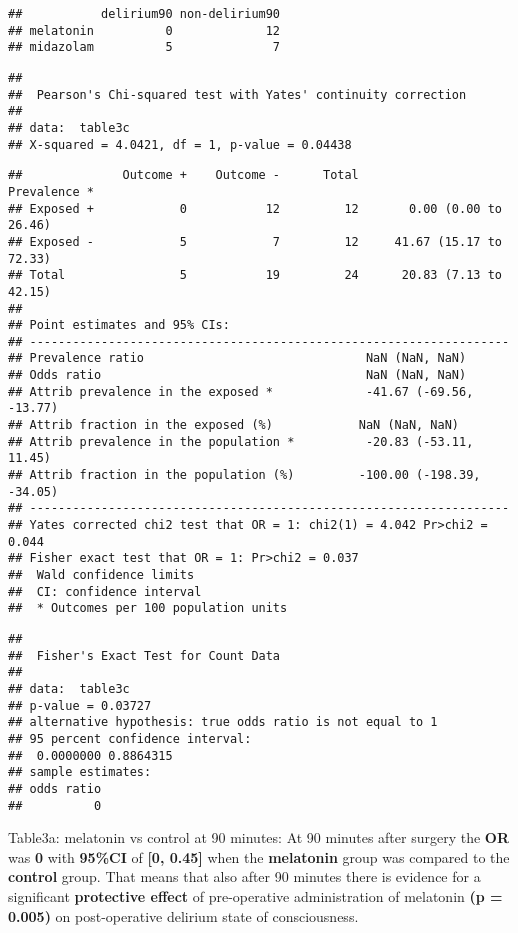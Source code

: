 \documentclass[
]{article}
\begin{document}
\begin{verbatim}
##           delirium90 non-delirium90
## melatonin          0             12
## midazolam          5              7
\end{verbatim}

\begin{verbatim}
## 
##  Pearson's Chi-squared test with Yates' continuity correction
## 
## data:  table3c
## X-squared = 4.0421, df = 1, p-value = 0.04438
\end{verbatim}

\begin{verbatim}
##              Outcome +    Outcome -      Total               Prevalence *
## Exposed +            0           12         12       0.00 (0.00 to 26.46)
## Exposed -            5            7         12     41.67 (15.17 to 72.33)
## Total                5           19         24      20.83 (7.13 to 42.15)
## 
## Point estimates and 95% CIs:
## -------------------------------------------------------------------
## Prevalence ratio                               NaN (NaN, NaN)
## Odds ratio                                     NaN (NaN, NaN)
## Attrib prevalence in the exposed *             -41.67 (-69.56, -13.77)
## Attrib fraction in the exposed (%)            NaN (NaN, NaN)
## Attrib prevalence in the population *          -20.83 (-53.11, 11.45)
## Attrib fraction in the population (%)         -100.00 (-198.39, -34.05)
## -------------------------------------------------------------------
## Yates corrected chi2 test that OR = 1: chi2(1) = 4.042 Pr>chi2 = 0.044
## Fisher exact test that OR = 1: Pr>chi2 = 0.037
##  Wald confidence limits
##  CI: confidence interval
##  * Outcomes per 100 population units
\end{verbatim}

\begin{verbatim}
## 
##  Fisher's Exact Test for Count Data
## 
## data:  table3c
## p-value = 0.03727
## alternative hypothesis: true odds ratio is not equal to 1
## 95 percent confidence interval:
##  0.0000000 0.8864315
## sample estimates:
## odds ratio 
##          0
\end{verbatim}

Table3a: melatonin vs control at 90 minutes: At 90 minutes after surgery
the \textbf{OR} was \textbf{0} with \textbf{95\%CI} of \textbf{{[}0,
0.45{]}} when the \textbf{melatonin} group was compared to the
\textbf{control} group. That means that also after 90 minutes there is
evidence for a significant \textbf{protective effect} of pre-operative
administration of melatonin \textbf{(p = 0.005)} on post-operative
delirium state of consciousness.
\end{document}
